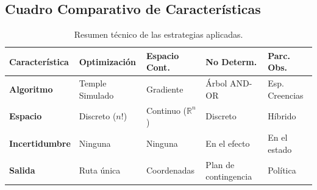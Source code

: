 \subsection{Cuadro Comparativo de Características}

\begin{table}[h!]
\centering
\begin{tabular}{@{}lllll@{}}
\toprule
\textbf{Característica} & \textbf{Optimización} & \textbf{Espacio Cont.} & \textbf{No Determ.} & \textbf{Parc. Obs.} \\ \midrule
\textbf{Algoritmo}      & Temple Simulado      & Gradiente              & Árbol AND-OR        & Esp. Creencias      \\
\textbf{Espacio}        & Discreto ($n!$)      & Continuo ($\mathbb{R}^n$) & Discreto            & Híbrido             \\
\textbf{Incertidumbre}  & Ninguna              & Ninguna                & En el efecto        & En el estado        \\
\textbf{Salida}         & Ruta única           & Coordenadas            & Plan de contingencia & Política            \\ \bottomrule
\end{tabular}
\caption{Resumen técnico de las estrategias aplicadas.}
\end{table}